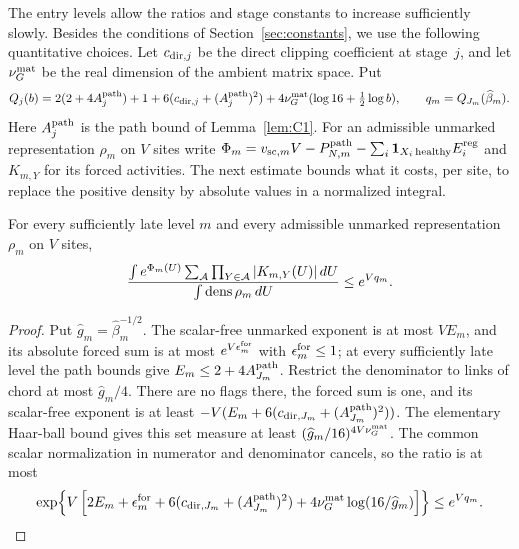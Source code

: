 The entry levels allow the ratios and stage constants to increase sufficiently slowly. Besides the conditions of Section~\ref{sec:constants}, we use the following quantitative choices. Let $c_{{\rm dir},j}$ be the direct clipping coefficient at stage~$j$, and let $\nu_G^{\rm mat}$ be the real dimension of the ambient matrix space. Put
\begin{equation}\label{eq:E-vacuum-majorant}
Q_j(b)=2(2+4A_j^{\rm path})+1+6(c_{{\rm dir},j}+(A_j^{\rm path})^2)
 +4\nu_G^{\rm mat}(\log16+\tfrac12\log b),\qquad q_m=Q_{J_m}(\widehat\beta_m).
\end{equation}
Here $A_j^{\rm path}$ is the path bound of Lemma~\ref{lem:C1}. For an admissible unmarked representation $\rho_m$ on $V$ sites write $\Phi_m=v_{{\rm sc},m}V-P^{\mathrm{path}}_{N,m}-\sum_i\mathbf1_{X_i\,\mathrm{healthy}}E_i^{\rm reg}$ and $K_{m,Y}$ for its forced activities. The next estimate bounds what it costs, per site, to replace the positive density by absolute values in a normalized integral.
\begin{lemma}\label{lem:E-normalization-cost}
For every sufficiently late level $m$ and every admissible unmarked representation $\rho_m$ on $V$ sites,
\begin{equation}\label{eq:E-vacuum-ratio}
 \frac{\int e^{\Phi_m(U)}\sum_{\mathcal A}\prod_{Y\in\mathcal A}|K_{m,Y}(U)|\,dU}
 {\int\operatorname{dens}\rho_m\,dU}\le e^{Vq_m}.
\end{equation}
\end{lemma}
\begin{proof}
Put $\widehat g_m=\widehat\beta_m^{-1/2}$. The scalar-free unmarked exponent is at most $VE_m$, and its absolute forced sum is at most $e^{V\epsilon_m^{\rm for}}$ with $\epsilon_m^{\rm for}\le1$; at every sufficiently late level the path bounds give $E_m\le2+4A_{J_m}^{\rm path}$. Restrict the denominator to links of chord at most $\widehat g_m/4$. There are no flags there, the forced sum is one, and its scalar-free exponent is at least $-V(E_m+6(c_{{\rm dir},J_m}+(A_{J_m}^{\rm path})^2))$. The elementary Haar-ball bound gives this set measure at least $(\widehat g_m/16)^{4V\nu_G^{\rm mat}}$. The common scalar normalization in numerator and denominator cancels, so the ratio is at most
\begin{equation*}
 \exp\!\left\{V\left[2E_m+\epsilon_m^{\rm for}
 +6(c_{{\rm dir},J_m}+(A_{J_m}^{\rm path})^2)
 +4\nu_G^{\rm mat}\log(16/\widehat g_m)\right]\right\}\le e^{Vq_m}.
\qedhere
\end{equation*}
\end{proof}
